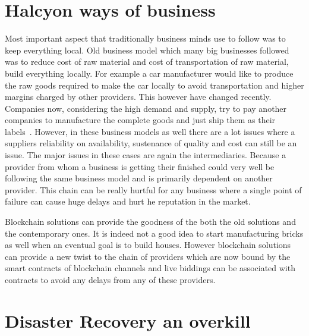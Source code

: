 \section{Halcyon ways of business}

Most important aspect that traditionally business minds use to follow
was to keep everything local. Old business model which many big
businesses followed was to reduce cost of raw material and cost of
transportation of raw material, build everything locally. For example
a car manufacturer would like to produce the raw goods required to
make the car locally to avoid transportation and higher margins
charged by other providers. This however have changed recently.
Companies now, considering the high demand and supply, try to pay
another companies to manufacture the complete goods and just ship them
as their labels~\cite{ewan30}. However, in these business models as
well there are a lot issues where a suppliers reliability on
availability, sustenance of quality and cost can still be an issue.
The major issues in these cases are again the intermediaries. Because
a provider from whom a business is getting their finished could very
well be following the same business model and is primarily dependent
on another provider. This chain can be really hurtful for any business
where a single point of failure can cause huge delays and hurt he
reputation in the market.

Blockchain solutions can provide the goodness of the both the old
solutions and the contemporary ones. It is indeed not a good idea to
start manufacturing bricks as well when an eventual goal is to build
houses. However blockchain solutions can provide a new twist to the
chain of providers which are now bound by the smart contracts of
blockchain channels and live biddings can be associated with contracts
to avoid any delays from any of these providers.

\section{Disaster Recovery an overkill}

